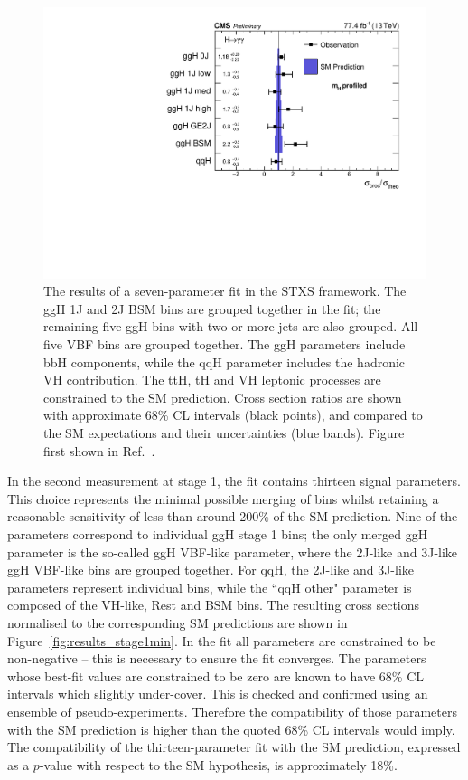 \begin{figure}[hptb]
  \centering
  \includegraphics[width=\textwidth]{Figures/Results/Stage1.pdf}
  \caption[Results of a seven-parameter fit in the STXS framework.]
  {
    The results of a seven-parameter fit in the STXS framework. 
    The ggH 1J and 2J BSM bins are grouped together in the fit; 
    the remaining five ggH bins with two or more jets are also grouped. 
    All five VBF bins are grouped together. 
    The ggH parameters include bbH components, 
    while the qqH parameter includes the hadronic VH contribution. 
    The ttH, tH and VH leptonic processes are constrained to the SM prediction. 
    Cross section ratios are shown with approximate 68\% CL intervals (black points), 
    and compared to the SM expectations and their uncertainties (blue bands).
    Figure first shown in Ref.~\cite{HIG-18-029}.
  }
  \label{fig:results_stage1}
\end{figure}

In the second measurement at stage 1, the fit contains thirteen signal parameters.
This choice represents the minimal possible merging of bins 
whilst retaining a reasonable sensitivity of less than around 200\% of the SM prediction.
Nine of the parameters correspond to individual ggH stage 1 bins; 
the only merged ggH parameter is the so-called ggH VBF-like parameter, 
where the 2J-like and 3J-like ggH VBF-like bins are grouped together.
For qqH, the 2J-like and 3J-like parameters represent individual bins, 
while the ``qqH other" parameter is composed of the VH-like, Rest and BSM bins.
The resulting cross sections normalised to the corresponding SM predictions 
are shown in Figure~\ref{fig:results_stage1min}.
In the fit all parameters are constrained to be non-negative -- this is necessary 
to ensure the fit converges.
The parameters whose best-fit values are constrained to be zero are known to have 68\% CL intervals 
which slightly under-cover. 
This is checked and confirmed using an ensemble of pseudo-experiments.
Therefore the compatibility of those parameters with the SM prediction is higher than 
the quoted 68\% CL intervals would imply.
The compatibility of the thirteen-parameter fit with the SM prediction, 
expressed as a $p$-value with respect to the SM hypothesis, is approximately 18\%.

